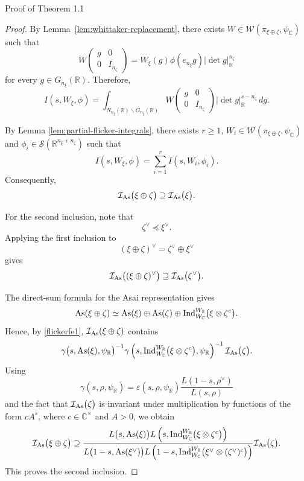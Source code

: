 \documentclass[12pt,reqno]{amsart}
\numberwithin{equation}{section}%
\numberwithin{equation}{subsection}
\theoremstyle{definition}
\theoremstyle{remark}
\begin{document}
\begin{section}{Proof of Theorem 1.1}
\begin{proof}
By Lemma~\ref{lem:whittaker-replacement}, there exists
$W\in\mathcal{W}(\pi_{\xi\oplus\zeta},\psi_{\mathbb{C}})$ such that
\[
W
\begin{pmatrix}
g&0\\
0&I_{n_\zeta}
\end{pmatrix}
=
W_\xi(g)\phi(e_{n_\xi}g)
|\det g|_{\mathbb{R}}^{n_\zeta}
\]
for every $g\in G_{n_\xi}(\mathbb{R})$. Therefore,
\[
I(s,W_\xi,\phi)
=
\int_{N_{n_\xi}(\mathbb{R})\backslash
G_{n_\xi}(\mathbb{R})}
W
\begin{pmatrix}
g&0\\
0&I_{n_\zeta}
\end{pmatrix}
|\det g|_{\mathbb{R}}^{s-n_\zeta}\,dg.
\]

By Lemma \ref{lem:partial-flicker-integrals}, there exists $r\geq 1$,
$W_i\in\mathcal{W}(\pi_{\xi\oplus\zeta},\psi_{\mathbb{C}})$ and
$\phi_i\in\mathcal{S}(\mathbb{R}^{n_\xi+n_\zeta})$ such that
\[
I(s,W_\xi,\phi)
=
\sum_{i=1}^r I(s,W_i,\phi_i).
\]
Consequently,
\[
\mathcal{I}_{\rm As}\bigl(\xi\oplus\zeta\bigr)
\supseteq
\mathcal{I}_{\rm As}\bigl(\xi\bigr).
\]

For the second inclusion, note that
\[
\zeta^\vee\preceq\xi^\vee.
\]
Applying the first inclusion to
\[
(\xi\oplus\zeta)^\vee
=
\zeta^\vee\oplus\xi^\vee
\]
gives
\[
\mathcal{I}_{\rm As}\bigl((\xi\oplus\zeta)^\vee\bigr)
\supseteq
\mathcal{I}_{\rm As}\bigl(\zeta^\vee\bigr).
\]

The direct-sum formula for the Asai representation gives
\[
{\rm As}(\xi\oplus\zeta)
\simeq
{\rm As}(\xi)
\oplus
{\rm As}(\zeta)
\oplus
\operatorname{Ind}_{W_{\mathbb{C}}}^{W_{\mathbb{R}}}
\bigl(\xi\otimes\zeta^c\bigr).
\]
Hence, by \eqref{flickerfe1},
$\mathcal{I}_{\rm As}(\xi\oplus\zeta)$ contains
\[
\gamma\bigl(s,{\rm As}(\xi),\psi_{\mathbb{R}}\bigr)^{-1}
\gamma\left(
s,
\operatorname{Ind}_{W_{\mathbb{C}}}^{W_{\mathbb{R}}}
\bigl(\xi\otimes\zeta^c\bigr),
\psi_{\mathbb{R}}
\right)^{-1}
\mathcal{I}_{\rm As}\bigl(\zeta\bigr).
\]
Using
\[
\gamma(s,\rho,\psi_{\mathbb{R}})
=
\varepsilon(s,\rho,\psi_{\mathbb{R}})
\frac{L(1-s,\rho^\vee)}{L(s,\rho)}
\]
and the fact that $\mathcal{I}_{\rm As}\bigl(\zeta\bigr)$ is invariant under
multiplication by functions of the form \(cA^s\), where
\(c\in\mathbb{C}^{\times}\) and \(A>0\), we obtain
\[
\mathcal{I}_{\rm As}\bigl(\xi\oplus\zeta\bigr)
\supseteq
\frac{
L\bigl(s,{\rm As}(\xi)\bigr)
L\left(
s,
\operatorname{Ind}_{W_{\mathbb{C}}}^{W_{\mathbb{R}}}
\bigl(\xi\otimes\zeta^c\bigr)
\right)
}{
L\bigl(1-s,{\rm As}(\xi^\vee)\bigr)
L\left(
1-s,
\operatorname{Ind}_{W_{\mathbb{C}}}^{W_{\mathbb{R}}}
\bigl(\xi^\vee\otimes(\zeta^\vee)^c\bigr)
\right)
}
\mathcal{I}_{\rm As}\bigl(\zeta\bigr).
\]
This proves the second inclusion.
\end{proof}


\end{section}
\end{document}
